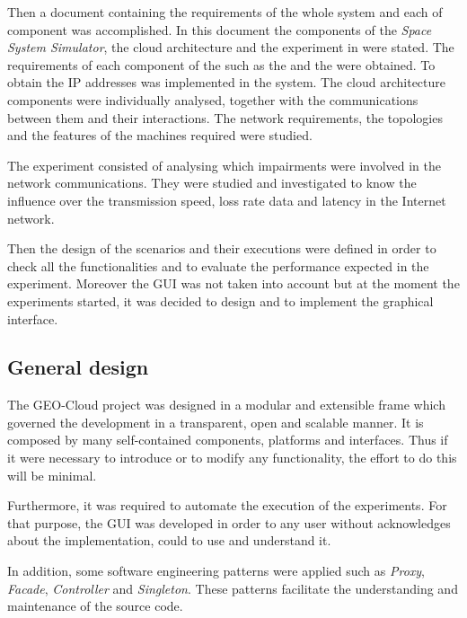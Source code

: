 Then a document containing the requirements of the whole system and each of
component was accomplished. In this document the components of the
\emph{Space System Simulator},
the cloud architecture and the experiment in \pl were stated. The requirements
of each component of
the \sss such as the \satss and the \gsss were obtained. To obtain the \ac{IP}
addresses was implemented in the system. The cloud architecture components were
individually analysed, together with the communications between them and their
interactions. The network requirements, the topologies and the features of the
machines required were studied.
  
The \pl experiment consisted of analysing which impairments
were involved in the network communications. They were studied and investigated to
know the influence over the transmission speed, loss rate data and latency in
the Internet network.

Then the design of the scenarios and their executions were defined in order to
check all the functionalities and to evaluate the performance expected in the experiment.
Moreover the \ac{GUI} was not taken into account but at the moment the
experiments started, it was decided to design and to implement the graphical interface.


\subsection{General design}

The GEO-Cloud project was designed in a modular and extensible
frame which governed the development in a transparent, open and scalable
manner. It is composed by many self-contained components, platforms and
interfaces. Thus if it were
necessary to introduce or to modify any functionality, the effort to do this will
be minimal.

Furthermore, it was required to automate the execution of the
experiments. For that purpose, the \ac{GUI} was developed in order to any user without acknowledges about the implementation, could to use and understand it.

In addition, some software engineering patterns were applied such as \emph{Proxy},
\emph{Facade}, \emph{Controller} and \emph{Singleton}. These patterns
facilitate the understanding and maintenance of the source code.

